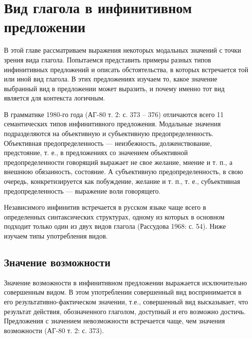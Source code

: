 \section{Вид глагола в инфинитивном предложении}

В этой главе рассматриваем выражения некоторых модальных значений с точки зрения вида глагола. Попытаемся представить примеры разных типов инфинитивных предложений и описать обстоятельства, в которых встречается той или иной вид глагола. В этих предложениях изучаем то, какое значение выбранный вид в предложении может выразить, и почему именно тот вид является для контекста логичным. 


В грамматике 1980-го года (АГ-80 т. 2: с. 373 -- 376) отличаются всего 11 семантических типов инфинитивного предложения. Модальные значения подразделяются на объективную и субъективную предопределенность. Объективная предопределенность --- неизбежность, долженствование, предстояние, т. е., в предложениях со значением объективной предопределенности говорящий выражает не свое желание, мнение и т. п., а внешнюю обязанность, состояние. А субъективную предопределенность, в свою очередь, конкретизируется как побуждение, желание и т. п., т. е., субъективная предопределенность --- выражение воли говорящего.

Независимого инфинитив встречается в русском языке чаще всего в определенных синтаксических структурах, одному из которых в основном подходит только один из двух видов глагола (Рассудова 1968: с. 54). Ниже изучаем типы употребления видов.

\subsection{Значение возможности}

Значение возможности в инфинитивном предложении выражается исключительно совершенным видом. В этом употреблении совершенный вид воспринимается в его результативно-фактическом значении, т.е., совершенный вид высказывает, что результат действия, обозначенного глаголом, доступный и его возможно достичь. Предложения с значением невозможности встречается чаще, чем значения возможности (АГ-80 т. 2: с. 373). 

